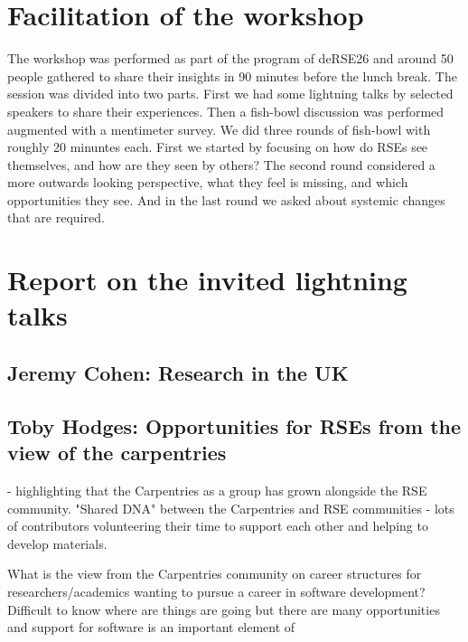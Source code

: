 \documentclass{eceasst}
\begin{document}
\section{Facilitation of the workshop}
The workshop was performed as part of the program of deRSE26 and around 50 people gathered to share their  insights in
90 minutes before the lunch break.
The session was divided into two parts. First we had some lightning talks by selected speakers to share their experiences.
Then a fish-bowl discussion was performed augmented with a mentimeter survey.
We did three rounds of fish-bowl with roughly 20 minuntes each. First we started by focusing on
how do RSEs see themselves, and how are they seen by others?
The second round considered a more outwards looking perspective, what they feel is missing, and which opportunities they see.
And in the last round we asked about systemic changes that are required.

\section{Report on the invited lightning talks}

\subsection{Jeremy Cohen: Research in the UK}

\subsection{Toby Hodges: Opportunities for RSEs from the view of the carpentries}

- highlighting that the Carpentries as a group has grown alongside the RSE community. "Shared DNA" between the Carpentries and RSE communities
- lots of contributors volunteering their time to support each other and helping to develop materials.

What is the view from the Carpentries community on career structures for researchers/academics wanting to pursue a career in software development? Difficult to know where are things are going but there are many opportunities and support for software is an important element of
\end{document}
